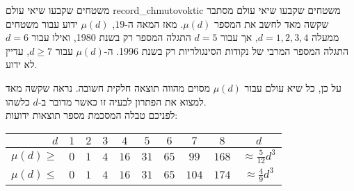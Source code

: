 \begin{surferIntroPage}{%
משטחים שקבעו שיאי עולם%
}{record_chmutovoktic}{%
משטחים שקבעו שיאי עולם%
}
 מסתבר שקשה מאד לחשב את המספר $\mu(d)$.
    מאז המאה ה-$19$, $\mu(d)$ ידוע עבור משטחים ממעלה $d=1,2,3,4$, אך עבור $d=5$
    התגלה המספר רק בשנת 1980, ואילו עבור $d=6$ התגלה המספר המרבי של נקודות הסינגולריות רק בשנת 1996.
    ה-$\mu(d)$ עבור $d\ge 7$, עדיין לא ידוע.
  
    על כן, כל שיא עולם עבור $\mu(d)$ מסוים מהווה תוצאה חלקית חשובה. נראה שקשה מאד למצוא את הפתרון לבעיה זו כאשר מדובר ב-$d$ כלשהו.\\  לפניכם טבלה המסכמת מספר תוצאות ידועות:
    
   \begin{center}
      \begin{tabular}{r|cccccccc|c}
        $d$ & $1$ & $2$ & $3$ & $4$ & $5$ & $6$ & $7$ & $8$ & $d$\\
        \hline
        \hline
        \rule{0pt}{1.2em}$\mu(d)\ge$ & $0$ & $1$ & $4$ & $16$ & $31$ & $65$ &
        $99$ & $168$ & 
        $\approx \frac{5}{12}d^3$\\[0.3em]
        \hline
        \rule{0pt}{1.2em}$\mu(d)\le$ & $0$ & $1$ & $4$ & $16$ & $31$ & $65$ &
        $104$ & $174$ & $\approx \frac{4}{9}d^3$
      \end{tabular}
    \end{center}
\end{surferIntroPage}
